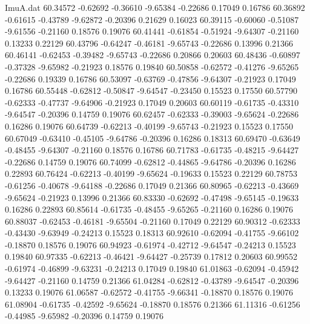 \begin{filecontents}{ImuA.dat}
  60.34572   -0.62692   -0.36610   -9.65384   -0.22686    0.17049    0.16786
  60.36892   -0.61615   -0.43789   -9.62872   -0.20396    0.21629    0.16023
  60.39115   -0.60060   -0.51087   -9.61556   -0.21160    0.18576    0.19076
  60.41441   -0.61854   -0.51924   -9.64307   -0.21160    0.13233    0.22129
  60.43796   -0.64247   -0.46181   -9.65743   -0.22686    0.13996    0.21366
  60.46141   -0.62453   -0.39482   -9.65743   -0.22686    0.20866    0.20603
  60.48436   -0.60897   -0.37328   -9.65982   -0.21923    0.18576    0.19840
  60.50858   -0.62572   -0.41276   -9.65265   -0.22686    0.19339    0.16786
  60.53097   -0.63769   -0.47856   -9.64307   -0.21923    0.17049    0.16786
  60.55448   -0.62812   -0.50847   -9.64547   -0.23450    0.15523    0.17550
  60.57790   -0.62333   -0.47737   -9.64906   -0.21923    0.17049    0.20603
  60.60119   -0.61735   -0.43310   -9.64547   -0.20396    0.14759    0.19076
  60.62457   -0.62333   -0.39003   -9.65624   -0.22686    0.16286    0.19076
  60.64739   -0.62213   -0.40199   -9.65743   -0.21923    0.15523    0.17550
  60.67049   -0.63410   -0.45105   -9.64786   -0.20396    0.16286    0.18313
  60.69470   -0.63649   -0.48455   -9.64307   -0.21160    0.18576    0.16786
  60.71783   -0.61735   -0.48215   -9.64427   -0.22686    0.14759    0.19076
  60.74099   -0.62812   -0.44865   -9.64786   -0.20396    0.16286    0.22893
  60.76424   -0.62213   -0.40199   -9.65624   -0.19633    0.15523    0.22129
  60.78753   -0.61256   -0.40678   -9.64188   -0.22686    0.17049    0.21366
  60.80965   -0.62213   -0.43669   -9.65624   -0.21923    0.13996    0.21366
  60.83330   -0.62692   -0.47498   -9.65145   -0.19633    0.16286    0.22893
  60.85614   -0.61735   -0.48455   -9.65265   -0.21160    0.16286    0.19076
  60.88037   -0.62453   -0.46181   -9.65504   -0.21160    0.17049    0.22129
  60.90312   -0.62333   -0.43430   -9.63949   -0.24213    0.15523    0.18313
  60.92610   -0.62094   -0.41755   -9.66102   -0.18870    0.18576    0.19076
  60.94923   -0.61974   -0.42712   -9.64547   -0.24213    0.15523    0.19840
  60.97335   -0.62213   -0.46421   -9.64427   -0.25739    0.17812    0.20603
  60.99552   -0.61974   -0.46899   -9.63231   -0.24213    0.17049    0.19840
  61.01863   -0.62094   -0.45942   -9.64427   -0.21160    0.14759    0.21366
  61.04284   -0.62812   -0.43789   -9.64547   -0.20396    0.13233    0.19076
  61.06587   -0.62572   -0.41755   -9.66341   -0.18870    0.18576    0.19076
  61.08904   -0.61735   -0.42592   -9.65624   -0.18870    0.18576    0.21366
  61.11316   -0.61256   -0.44985   -9.65982   -0.20396    0.14759    0.19076

\end{filecontents}
